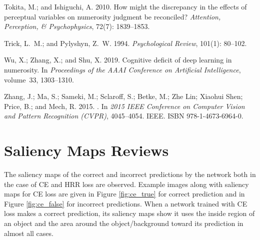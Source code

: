 \documentclass[letterpaper]{article} %
\begin{document}
\begin{thebibliography}{33}
    Tokita, M.; and Ishiguchi, A. 2010.
    \newblock How might the discrepancy in the effects of perceptual variables on
      numerosity judgment be reconciled?
    \newblock \emph{Attention, Perception, \& Psychophysics}, 72(7): 1839--1853.
    
    Trick, L.~M.; and Pylyshyn, Z.~W. 1994.
    \newblock \emph{Psychological Review}, 101(1): 80--102.
    
    Wu, X.; Zhang, X.; and Shu, X. 2019.
    \newblock Cognitive deficit of deep learning in numerosity.
    \newblock In \emph{Proceedings of the AAAI Conference on Artificial
      Intelligence}, volume~33, 1303--1310.
    
    Zhang, J.; Ma, S.; Sameki, M.; Sclaroff, S.; Betke, M.; {Zhe Lin}; {Xiaohui
      Shen}; Price, B.; and Mech, R. 2015.
    .
    \newblock In \emph{2015 IEEE Conference on Computer Vision and Pattern
      Recognition (CVPR)}, 4045--4054. IEEE.
    \newblock ISBN 978-1-4673-6964-0.
    
\end{thebibliography}    


\appendix
\newpage
\onecolumn


\section{Saliency Maps Reviews} \label{appendix:saliency}
The saliency maps of the correct and incorrect predictions by the network both in the case of CE and HRR loss are observed. Example images along with saliency maps for CE loss are given in Figure \ref{fig:ce_true} for correct prediction and in Figure \ref{fig:ce_false} for incorrect predictions.  When a network trained with CE loss makes a correct prediction, its saliency maps show it uses the inside region of an object and the area around the object/background toward its prediction in almost all cases.
\end{document}
